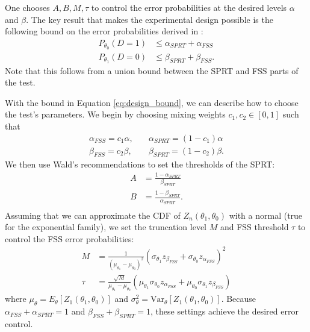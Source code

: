 \documentclass[11pt]{article}
\begin{document}
One chooses $A, B, M, \tau$ to control the error probabilities at the desired levels $\alpha$ and $\beta$. The key result that makes the experimental design possible is the following bound on the error probabilities derived in \citet{tantara1977}:
\begin{equation}\label{eq:design_bound}
\begin{split}
P_{\theta_0}(D = 1) &\leq \alpha_{SPRT} + \alpha_{FSS} \\
P_{\theta_1}(D = 0) &\leq \beta_{SPRT} + \beta_{FSS}.
\end{split}
\end{equation}
Note that this follows from a union bound between the SPRT and FSS parts of the test.

With the bound in Equation \ref{eq:design_bound}, we can describe how to choose the test's parameters. We begin by choosing mixing weights $c_1, c_2 \in \left[0, 1\right]$ such that
\begin{equation}
\begin{split}
\alpha_{FSS} = c_1 \alpha, \quad &\alpha_{SPRT} = (1 - c_1) \alpha \\
\beta_{FSS} = c_2 \beta, \quad &\beta_{SPRT} = (1 - c_2) \beta.
\end{split}
\end{equation}
We then use Wald's recommendations to set the thresholds of the SPRT:
\begin{equation}
\begin{split}
A &= \frac{1 - \alpha_{SPRT}}{\beta_{SPRT}} \\
B &= \frac{1 - \beta_{SPRT}}{\alpha_{SPRT}}. \\
\end{split}
\end{equation}
Assuming that we can approximate the CDF of $Z_n(\theta_1, \theta_0)$ with a normal (true for the exponential family), we set the truncation level $M$ and FSS threshold $\tau$ to control the FSS error probabilities:
\begin{equation}
\begin{split}
M &= \frac{1}{(\mu_{\theta_1} - \mu_{\theta_0})^2} \left(\sigma_{\theta_1} z_{\beta_{FSS}} + \sigma_{\theta_0}z_{\alpha_{FSS}}\right)^2 \\
\tau &= \frac{\sqrt{M}}{\mu_{\theta_1} - \mu_{\theta_0}} \left(\mu_{\theta_1} \sigma_{\theta_0} z_{\alpha_{FSS}} + \mu_{\theta_0} \sigma_{\theta_1} z_{\beta_{FSS}}\right)
\end{split}
\end{equation}
where $\mu_{\theta} = E_{\theta}\left[Z_1(\theta_1, \theta_0)\right]$ and $\sigma^2_{\theta} = \text{Var}_{\theta}\left[Z_1(\theta_1, \theta_0)\right]$. Because $\alpha_{FSS} + \alpha_{SPRT} = 1$ and $\beta_{FSS} + \beta_{SPRT} = 1$, these settings achieve the desired error control.
\end{document}
